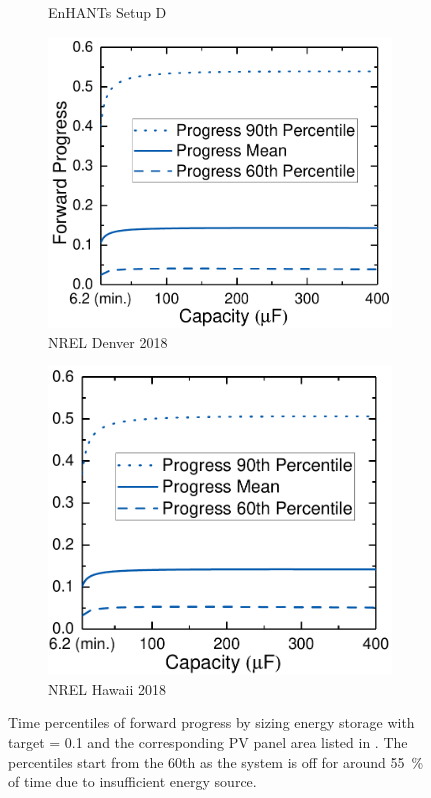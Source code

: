 \begin{figure}
\begin{subfigure}{0.483\columnwidth}
        \caption{EnHANTs Setup D}
        \label{fig:harvstorrange2}
    \end{subfigure}
    \hfil
    \begin{subfigure}{0.51\columnwidth}
        \centering
        \includegraphics[width=\columnwidth]{ch4_sizingapproach/figures/HarvStorRan2Fig3}
        \caption{NREL Denver 2018}
        \label{fig:harvstorrange3}
    \end{subfigure}
    \begin{subfigure}{0.483\columnwidth}
        \centering
        \includegraphics[width=\columnwidth]{ch4_sizingapproach/figures/HarvStorRan2Fig4}
        \caption{NREL Hawaii 2018}
        \label{fig:harvstorrange4}
    \end{subfigure}
    \caption{Time percentiles of forward progress by sizing energy storage with target  = 0.1 and the corresponding PV panel area listed in . The percentiles start from the 60th as the system is off for around \SI{55}{\percent} of time due to insufficient energy source. }
    \label{fig:harvstorrange}
\end{figure}
